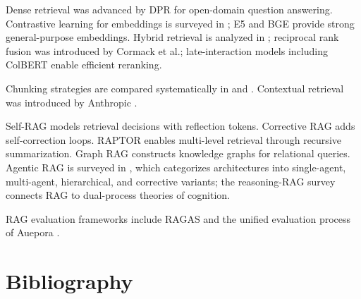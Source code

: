 \documentclass[11pt]{book}
\begin{document}
Dense retrieval was advanced by DPR \cite{dpr2020} for open-domain question answering. Contrastive learning for embeddings is surveyed in \cite{embeddingsurvey}; E5 \cite{e5} and BGE provide strong general-purpose embeddings. Hybrid retrieval is analyzed in \cite{hybridrag2025}; reciprocal rank fusion was introduced by Cormack et al.; late-interaction models including ColBERT \cite{colbert} enable efficient reranking.

Chunking strategies are compared systematically in \cite{chunkstudy2025} and \cite{chunkeval2026}. Contextual retrieval was introduced by Anthropic \cite{anthropic2024contextual}.

Self-RAG \cite{selfrag} models retrieval decisions with reflection tokens. Corrective RAG \cite{crag} adds self-correction loops. RAPTOR \cite{raptor} enables multi-level retrieval through recursive summarization. Graph RAG \cite{graphrag} constructs knowledge graphs for relational queries. Agentic RAG is surveyed in \cite{agenticrag2025}, which categorizes architectures into single-agent, multi-agent, hierarchical, and corrective variants; the reasoning-RAG survey \cite{reasoningrag2025} connects RAG to dual-process theories of cognition.

RAG evaluation frameworks include RAGAS \cite{ragas} and the unified evaluation process of Auepora \cite{auepora}.

\section*{Bibliography}
\end{document}
